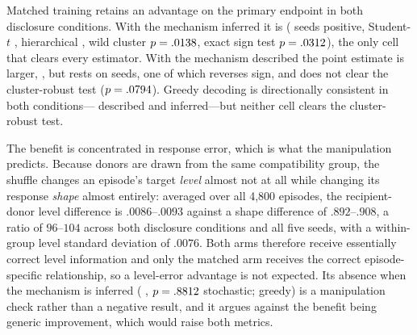 Matched training retains an advantage on the primary endpoint in both
disclosure conditions. With the mechanism inferred it is
\eShufUndiscStochEst{} (\eShufUndiscStochSign{} seeds positive, Student-$t$
\eShufUndiscStochTci{}, hierarchical \eShufUndiscStochCi{}, wild cluster
$p=.0138{}$, exact sign test $p=.0312{}$),
the only cell that clears every estimator. With the mechanism described the
point estimate is larger, \eShufDiscStochEst{} \eShufDiscStochCi{}, but rests
on \eShufDiscStochSign{} seeds, one of which reverses sign, and does not clear
the cluster-robust test ($p=.0794{}$). Greedy decoding is
directionally consistent in both conditions---\eShufDiscGreedyEst{} described
and \eShufUndiscGreedyEst{} inferred---but neither cell clears the
cluster-robust test.

\begin{table}[htbp]
\centering\footnotesize
\setlength{\tabcolsep}{3pt}

\caption{\textbf{The matched advantage does not appear in level error.}
Shuffled-minus-matched level MAE, same runs and estimators as
Table~\ref{tab:exp3-shuffled-control}. The inferred-mechanism cells show no
matched benefit. This contrast was not pre-registered and is descriptive.}
\label{tab:exp3-shuffled-control-level}
\end{table}

The benefit is concentrated in response error, which is what the manipulation
predicts. Because donors are drawn from the same compatibility group, the
shuffle changes an episode's target \emph{level} almost not at all while
changing its response \emph{shape} almost entirely: averaged over all 4,800
episodes, the recipient-donor level difference is $.0086$--$.0093$ against a
shape difference of $.892$--$.908$, a ratio of $96$--$104$ across both
disclosure conditions and all five seeds, with a within-group level standard
deviation of $.0076$. Both arms therefore receive essentially correct level
information and only the matched arm receives the correct episode-specific
relationship, so a level-error advantage is not expected. Its absence when the
mechanism is inferred (\eShufUndiscStochLevelEst{} \eShufUndiscStochLevelCi{},
$p=.8812{}$ stochastic; \eShufUndiscGreedyLevelEst{}
\eShufUndiscGreedyLevelCi{} greedy) is a manipulation check rather than a
negative result, and it argues against the benefit being generic improvement,
which would raise both metrics.

